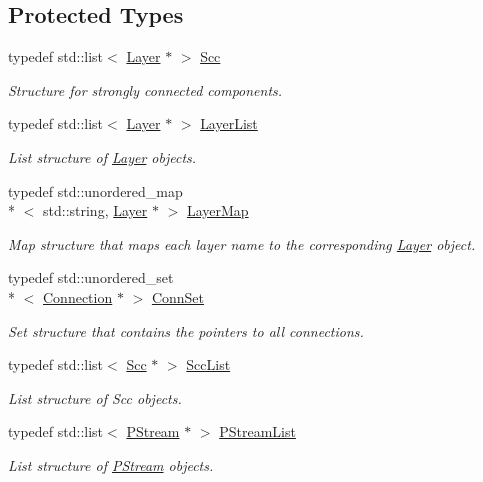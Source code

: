 \subsection*{Protected Types}
\begin{DoxyCompactItemize}
\item 
typedef std\+::list$<$ \hyperlink{classfractal_1_1Layer}{Layer} $\ast$ $>$ \hyperlink{classfractal_1_1Rnn_aea69a9549eee7a4de8163e2bc6be19a1}{Scc}
\begin{DoxyCompactList}\small\item\em Structure for strongly connected components. \end{DoxyCompactList}\item 
typedef std\+::list$<$ \hyperlink{classfractal_1_1Layer}{Layer} $\ast$ $>$ \hyperlink{classfractal_1_1Rnn_a47ec5588c6a0bed3c6af1b34ea8e8070}{Layer\+List}
\begin{DoxyCompactList}\small\item\em List structure of \hyperlink{classfractal_1_1Layer}{Layer} objects. \end{DoxyCompactList}\item 
typedef std\+::unordered\+\_\+map\\*
$<$ std\+::string, \hyperlink{classfractal_1_1Layer}{Layer} $\ast$ $>$ \hyperlink{classfractal_1_1Rnn_a41ef29c0e8d4bfa783a6abe33b685ec0}{Layer\+Map}
\begin{DoxyCompactList}\small\item\em Map structure that maps each layer name to the corresponding \hyperlink{classfractal_1_1Layer}{Layer} object. \end{DoxyCompactList}\item 
typedef std\+::unordered\+\_\+set\\*
$<$ \hyperlink{classfractal_1_1Connection}{Connection} $\ast$ $>$ \hyperlink{classfractal_1_1Rnn_a9899dedd3e89a1375a09ba7cc86fbf2b}{Conn\+Set}
\begin{DoxyCompactList}\small\item\em Set structure that contains the pointers to all connections. \end{DoxyCompactList}\item 
typedef std\+::list$<$ \hyperlink{classfractal_1_1Rnn_aea69a9549eee7a4de8163e2bc6be19a1}{Scc} $\ast$ $>$ \hyperlink{classfractal_1_1Rnn_a640b44b0317d2b4055fcdabbfd6456ce}{Scc\+List}
\begin{DoxyCompactList}\small\item\em List structure of Scc objects. \end{DoxyCompactList}\item 
typedef std\+::list$<$ \hyperlink{classfractal_1_1PStream}{P\+Stream} $\ast$ $>$ \hyperlink{classfractal_1_1Rnn_af804f677610b7429ca199ac35510e503}{P\+Stream\+List}
\begin{DoxyCompactList}\small\item\em List structure of \hyperlink{classfractal_1_1PStream}{P\+Stream} objects. \end{DoxyCompactList}\end{DoxyCompactItemize}
